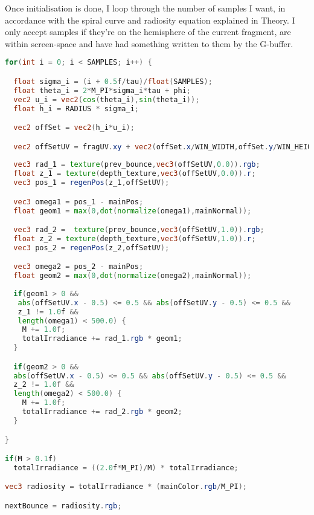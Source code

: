 Once initialisation is done, I loop through the number of samples I want, in accordance with the spiral curve and radiosity equation explained in Theory. I only accept samples if they're on the hemisphere of the current fragment, are within screen-space and have had something written to them by the G-buffer.
\begin{lstlisting}[caption={apply\_rad\_bounce.frag},language=GLSL]
for(int i = 0; i < SAMPLES; i++) {

  float sigma_i = (i + 0.5f/tau)/float(SAMPLES);
  float theta_i = 2*M_PI*sigma_i*tau + phi;
  vec2 u_i = vec2(cos(theta_i),sin(theta_i));
  float h_i = RADIUS * sigma_i;

  vec2 offSet = vec2(h_i*u_i);

  vec2 offSetUV = fragUV.xy + vec2(offSet.x/WIN_WIDTH,offSet.y/WIN_HEIGHT);
  
  vec3 rad_1 = texture(prev_bounce,vec3(offSetUV,0.0)).rgb;
  float z_1 = texture(depth_texture,vec3(offSetUV,0.0)).r;
  vec3 pos_1 = regenPos(z_1,offSetUV);

  vec3 omega1 = pos_1 - mainPos;
  float geom1 = max(0,dot(normalize(omega1),mainNormal));

  vec3 rad_2 =  texture(prev_bounce,vec3(offSetUV,1.0)).rgb;
  float z_2 = texture(depth_texture,vec3(offSetUV,1.0)).r;
  vec3 pos_2 = regenPos(z_2,offSetUV);

  vec3 omega2 = pos_2 - mainPos;
  float geom2 = max(0,dot(normalize(omega2),mainNormal));
  
  if(geom1 > 0 &&
   abs(offSetUV.x - 0.5) <= 0.5 && abs(offSetUV.y - 0.5) <= 0.5 &&
   z_1 != 1.0f &&
   length(omega1) < 500.0) {
    M += 1.0f;
    totalIrradiance += rad_1.rgb * geom1;
  }

  if(geom2 > 0 &&
  abs(offSetUV.x - 0.5) <= 0.5 && abs(offSetUV.y - 0.5) <= 0.5 &&
  z_2 != 1.0f &&
  length(omega2) < 500.0) {
    M += 1.0f;
    totalIrradiance += rad_2.rgb * geom2;
  }

}

if(M > 0.1f)
  totalIrradiance = ((2.0f*M_PI)/M) * totalIrradiance;

vec3 radiosity = totalIrradiance * (mainColor.rgb/M_PI);

nextBounce = radiosity.rgb;
\end{lstlisting}

